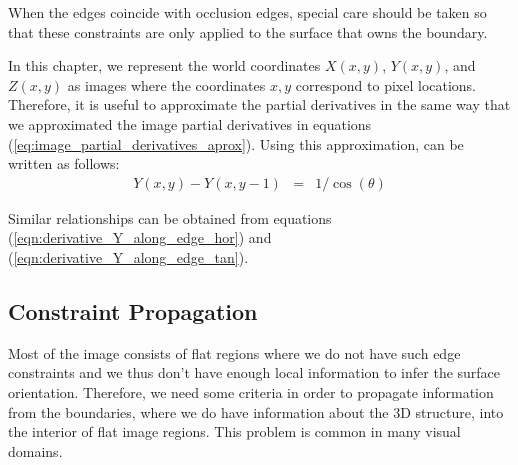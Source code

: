 When the edges coincide with occlusion edges, special care should be taken so that these constraints are only applied to the surface that owns the boundary. 

In this chapter, we represent the world coordinates $X(x,y)$, $Y(x,y)$, and $Z(x,y)$ as images where the coordinates $x,y$ correspond to pixel locations. Therefore, it is useful to approximate the partial derivatives in the same way that we approximated the image partial derivatives in equations (\ref{eq:image_partial_derivatives_aprox}). Using this approximation, \eqn{\ref{eqn:derivative_Y_along_edge}} can be written as follows:
\begin{eqnarray}
Y(x,y)-Y(x,y-1) & = & 1/ \cos(\theta)
\end{eqnarray}

Similar relationships can be obtained from equations (\ref{eqn:derivative_Y_along_edge_hor}) and (\ref{eqn:derivative_Y_along_edge_tan}).

\subsection{Constraint Propagation}
\label{sect:constraint}

Most of the image consists of flat regions where we do not have such edge constraints and we thus don't have enough local information to infer the surface orientation. Therefore, we need some criteria in order to propagate information from the  boundaries, where we do have information about the 3D structure, into the interior of flat image regions. This problem is common in many visual domains. 



